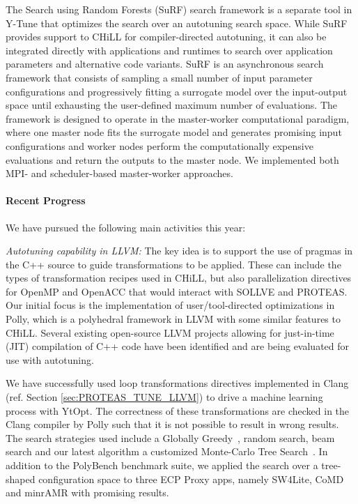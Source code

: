 The Search using Random Forests (SuRF) search framework is a separate tool in Y-Tune that optimizes the search over an autotuning search space.  While
SuRF provides support to CHiLL for compiler-directed autotuning, it can
also be integrated directly with applications and runtimes to search over
application parameters and alternative code variants.
SuRF is an asynchronous search framework that consists of sampling a small number of input parameter configurations and progressively fitting a surrogate model over the input-output space until exhausting the user-defined maximum number of evaluations. The framework is designed to operate in the master-worker computational paradigm, where one master node fits the surrogate model and generates promising input configurations and worker nodes perform the computationally expensive evaluations and return the outputs to the master node. We implemented both MPI- and scheduler-based master-worker approaches.


\paragraph{Recent Progress}


We have pursued the following main activities this year:

\textit{Autotuning capability in LLVM:}
The key idea is to support the use of pragmas in the C++ source to guide transformations to be applied. These can include the types of transformation recipes used in CHiLL, but also parallelization directives for OpenMP and OpenACC that would interact with SOLLVE and PROTEAS. Our initial focus is the implementation of user/tool-directed optimizations in Polly, which is a polyhedral framework in LLVM with some similar features to CHiLL. Several existing open-source LLVM projects allowing for just-in-time (JIT) compilation of C++ code have been identified and are being evaluated for use with autotuning. 

We have successfully used loop transformations directives implemented in Clang (ref. Section \ref{sec:PROTEAS_TUNE_LLVM}) to drive a machine learning process with YtOpt. The correctness of these transformations are checked in the Clang compiler by Polly such that it is not possible to result in wrong results. The search strategies used include a Globally Greedy~\cite{kruse2020search}, random search, beam search and our latest algorithm a customized Monte-Carlo Tree Search~\cite{wu2021autotuning}.
In addition to the PolyBench benchmark suite, we applied the search over a tree-shaped configuration space to three ECP Proxy apps, namely SW4Lite, CoMD and minrAMR with promising results.


